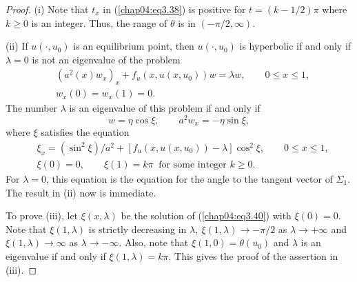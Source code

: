 \documentclass{surv-l}
\theoremstyle{plain}
\theoremstyle{definition}
\numberwithin{equation}{section}
\numberwithin{figure}{chapter}
\begin{document}
\begin{proof} (i) Note that $t_{x}$ in (\ref{chap04:eq3.38}) is positive for $ t=(k-1/2)\pi$ where $k\geq 0$ is an integer. Thus, the range of $\theta$ is in $(-\pi/2, \infty)$.

(ii) If $u(\cdot, u_{0})$ is an equilibrium point, then $u(\cdot, u_{0})$ is hyperbolic if and only if $\lambda=0$ is not an eigenvalue of the problem
\begin{align*}
&(a^{2}(x)w_{x})_{x}+f_{u}(x, u(x, u_{0}))w=\lambda w,\qquad 0\leq x\leq 1,\\
&w_{x}(0)=w_{x}(1)=0.
\end{align*}
The number $\lambda$ is an eigenvalue of this problem if and only if
\begin{equation*}
w=\eta\cos\xi, \qquad a^{2}w_{x}=-\eta\sin\xi,
\end{equation*}
where $\xi$ satisfies the equation
\begin{equation}\label{chap04:eq3.40}
\begin{split}
&\xi_{x}=(\sin^{2}\xi)/a^{2}+[f_{u}(x, u(x, u_{0}))-\lambda]\cos^{2}\xi,\qquad 0\leq x\leq 1,\\ &\xi(0)=0,\qquad \xi(1)=k\pi\ \text{ for some integer }k\geq 0.
\end{split}
\end{equation}
For $\lambda=0$, this equation is the equation for the angle to the tangent vector of $\Sigma_{1}$. The result in (ii) now is immediate.

To prove (iii), let $\xi(x, \lambda)$ be the solution of (\ref{chap04:eq3.40}) with $\xi(0)=0$. Note that $\xi(1, \lambda)$ is strictly decreasing in $\lambda,\ \xi(1, \lambda)\rightarrow-\pi/2$ as $\lambda\rightarrow+\infty$ and $\xi(1, \lambda)\rightarrow\infty$ as $\lambda\rightarrow-\infty$. Also, note that $\xi(1,0)=\theta(u_{0})$ and $\lambda$ is an eigenvalue if and only if $\xi(1, \lambda)=k\pi$. This gives the proof of the assertion in (iii).


\end{proof}
\end{document}
